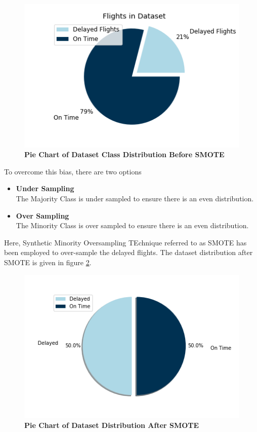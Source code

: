 \documentclass[12pt]{extarticle}
\begin{document}
\begin{figure}[h]
    \centering
    \includegraphics[scale=0.55]{DatasetClassDistributionPieChart.png}
    \caption{\textbf{Pie Chart of Dataset Class Distribution Before SMOTE}}
    \label{figure:2}
\end{figure}

To overcome this bias, there are two options
\begin{itemize}
    \item \textbf{Under Sampling}\\
    The Majority Class is under sampled to ensure there is an even distribution.
    \item \textbf{Over Sampling}\\
    The Minority Class is over sampled to ensure there is an even distribution.
\end{itemize}
Here, Synthetic Minority Oversampling TEchnique referred to as SMOTE has been employed to over-sample the delayed flights. The dataset distribution after SMOTE is given in figure \ref{figure:3}.

\begin{figure}[h]
    \centering
    \includegraphics[scale=0.60]{PieAfterSMOTE.png}
    \caption{\textbf{Pie Chart of Dataset Distribution After SMOTE}}
    \label{figure:3}
\end{figure}
\end{document}
